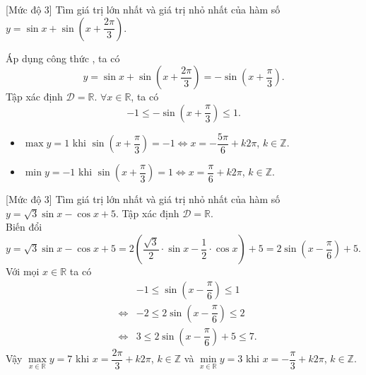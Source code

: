 \begin{bt}%
	[Mức độ 3]
	Tìm giá trị lớn nhất và giá trị nhỏ nhất của hàm số $ y=\sin x+\sin \left(x+{\dfrac{2\pi}{3}}\right)$.
	\loigiai
	{
		Áp dụng công thức , ta có
		\begin{equation*}
			y=\sin x + \sin \left (x+\dfrac{2\pi}{3}\right )=-\sin \left (x+\dfrac{\pi}{3}\right ).
		\end{equation*}
		Tập xác định $ \mathscr{D}=\mathbb{R}$. $ \forall x \in \mathbb{R} $, ta có 
		\begin{equation*}
			-1 \leq -\sin \left (x+\dfrac{\pi}{3}\right ) \leq 1.
		\end{equation*}
	\begin{itemize}
		\item $ \max y=1 $ khi $ \sin \left (x+\dfrac{\pi}{3}\right )=-1 \Leftrightarrow x=-\dfrac{5\pi}{6}+k2\pi$, $k\in \mathbb{Z}$.
		\item $ \min y=-1 $ khi $ \sin \left (x+\dfrac{\pi}{3}\right )=1 \Leftrightarrow x=\dfrac{\pi}{6}+k2\pi$, $k\in \mathbb{Z}$.
	\end{itemize}
	}
\end{bt}

\begin{bt}%
	[Mức độ 3]
	Tìm giá trị lớn nhất và giá trị nhỏ nhất của hàm số $y=\sqrt{3} \sin x-\cos x+5$.
	\loigiai
	{
		Tập xác định $\mathscr{D}=\mathbb{R}$.\\
		Biến đổi $y=\sqrt{3} \sin x-\cos x+5=2\left(\dfrac{\sqrt{3}}{2}\cdot\sin x-\dfrac{1}{2}\cdot\cos x\right)+5=2\sin\left(x-\dfrac{\pi}{6}\right)+5$.\\
		Với mọi $x\in \mathbb{R}$ ta có
		\allowdisplaybreaks
		\begin{eqnarray*}
			& & -1\leq \sin\left(x-\dfrac{\pi}{6}\right)\leq 1\\
			&\Leftrightarrow& -2\leq 2\sin\left(x-\dfrac{\pi}{6}\right)\leq 2\\
			&\Leftrightarrow&3\leq  2\sin\left(x-\dfrac{\pi}{6}\right)+5\leq 7.
		\end{eqnarray*}
		Vậy $\max\limits_{x \in \mathbb{R}} y=7$ khi $x=\dfrac{2\pi}{3}+k2\pi$, $k\in \mathbb{Z}$ và $\min\limits_{x \in \mathbb{R}} y=3$ khi $x=-\dfrac{\pi}{3}+k2\pi$, $k\in \mathbb{Z}$.
	}
\end{bt}

